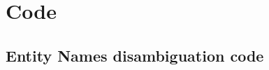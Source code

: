 \chapter{Code}\label{chap_code}



\newpage
\section{Entity Names disambiguation code}
 


\newpage



\newpage


